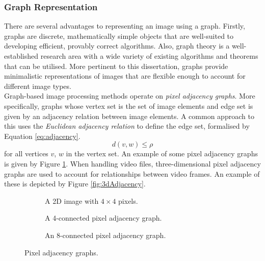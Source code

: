 \subsubsection{Graph Representation}
\label{sec:graphReps}
\setlength{\leftskip}{0.5cm}
\indent \indent
There are several advantages to representing an image using a graph. Firstly, graphs are discrete, mathematically simple objects that are well-suited to developing efficient, provably correct algorithms. Also, graph theory is a well-established research area with a wide variety of existing algorithms and theorems that can be utilised. More pertinent to this dissertation, graphs provide minimalistic representations of images that are flexible enough to account for different image types.
\smallskip \\ \indent
Graph-based image processing methods operate on \textit{pixel adjacency graphs}. More specifically, graphs whose vertex set is the set of image elements and edge set is given by an adjacency relation between image elements. A common approach to this uses the \textit{Euclidean adjacency relation} to define the edge set, formalised by Equation \ref{eq:adjacency}.
\begin{equation}
    d(v, w) \leq \rho
\end{equation}
for all vertices $v$, $w$ in the vertex set.  An example of some pixel adjacency graphs is given by Figure \ref{fig:pixelAdjacency}. When handling video files, three-dimensional pixel adjacency graphs are used to account for relationships between video frames. An example of these is depicted by Figure \ref{fig:3dAdjacency}.
\begin{figure}[h!]
    \centering
    \begin{subfigure}[b]{0.29\textwidth}
        \centering
        \captionsetup{justification=centering}
        \scalebox{1}{}
        \caption{A 2D image with $4 \times 4$ pixels.}
    \end{subfigure} \hfill%
    \begin{subfigure}[b]{0.29\textwidth}
        \centering
        \captionsetup{justification=centering}
        \scalebox{1}{}
        \caption{A 4-connected pixel adjacency graph.}
    \end{subfigure} \hfill%
    \begin{subfigure}[b]{0.29\textwidth}
        \centering
        \captionsetup{justification=centering}
        \scalebox{1}{}
        \caption{An 8-connected pixel adjacency graph.}
    \end{subfigure}%
    \caption[Pixel Adjacency Graphs]{Pixel adjacency graphs.}
    \label{fig:pixelAdjacency}
\end{figure}
